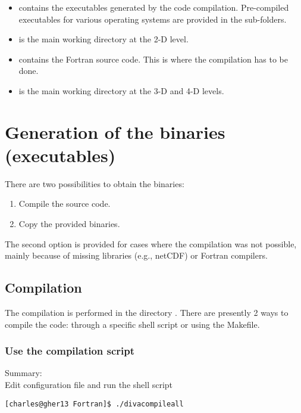 \begin{itemize}
\item {} contains the executables generated by the code compilation. Pre-compiled executables for various operating systems are provided in the sub-folders.
\item {} is the main working directory at the 2-D level. 
\item {} contains the Fortran source code. This is where the compilation has to be done.
\item {} is the main working directory at the 3-D and 4-D levels.
\end{itemize}

\section{Generation of the binaries (executables)}

There are two possibilities to obtain the binaries: 
\begin{enumerate}
\item Compile the source code.
\item Copy the provided binaries.
\end{enumerate}
The second option is provided for cases where the compilation was not possible, mainly because of missing libraries (e.g., netCDF) or Fortran compilers.

\subsection{Compilation\label{sec:compilation}}

The compilation is performed in the directory . There are presently 2 ways to compile the code: through a specific shell script or using the Makefile.

\subsubsection{Use the compilation script}

Summary:\\ 
Edit configuration file  and run the shell script 
\begin{lstlisting}[style=Bash]
[charles@gher13 Fortran]$ ./divacompileall
\end{lstlisting}

